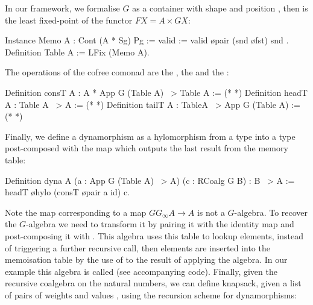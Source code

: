 \documentclass[a4paper,UKenglish,cleveref, autoref, thm-restate]{lipics-v2021}
\begin{document}
In our framework, we formalise $G$ as a container with shape  and
position , then  is the least fixed-point of the functor
$F X = A \times GX$:
\begin{coqcode}
Instance Memo A : Cont (A * Sg) Pg := { valid := valid \o pair (snd \o fst) snd }.
Definition Table A := LFix (Memo A).
\end{coqcode}
The operations of the cofree comonad  are the , the  and the :
\begin{coqcode}
Definition consT A : A * App G (Table A) ~> Table A := (* *)
Definition headT A : Table A ~> A := (* *)
Definition tailT A : TableA  ~> App G (Table A) := (* *)
\end{coqcode}
Finally, we define a dynamorphism as a hylomorphism from a type  into a
type  post-composed with the  map which outputs the last
result from the memory table:
\begin{coqcode}
Definition dyna A (a : App G (Table A) ~> A) (c : RCoalg G B) : B ~> A
  := headT \o hylo (consT \o pair a id) c.
\end{coqcode}
Note the map  corresponding to a map $G G_{\infty}A \to A$
is not a $G$-algebra.  To recover the $G$-algebra we need to transform it by pairing it with the identity map and
post-composing it with . This algebra uses this table to lookup
elements, instead of triggering a further recursive call, then elements are
inserted into the memoisation table by the use of  to the result of
applying the algebra. In our example this algebra is called  (see
accompanying code).
Finally, given the recursive coalgebra  on the natural numbers, we
can define knapsack, given a list of pairs of weights and values ,
using the recursion scheme for dynamorphisms:
\end{document}
